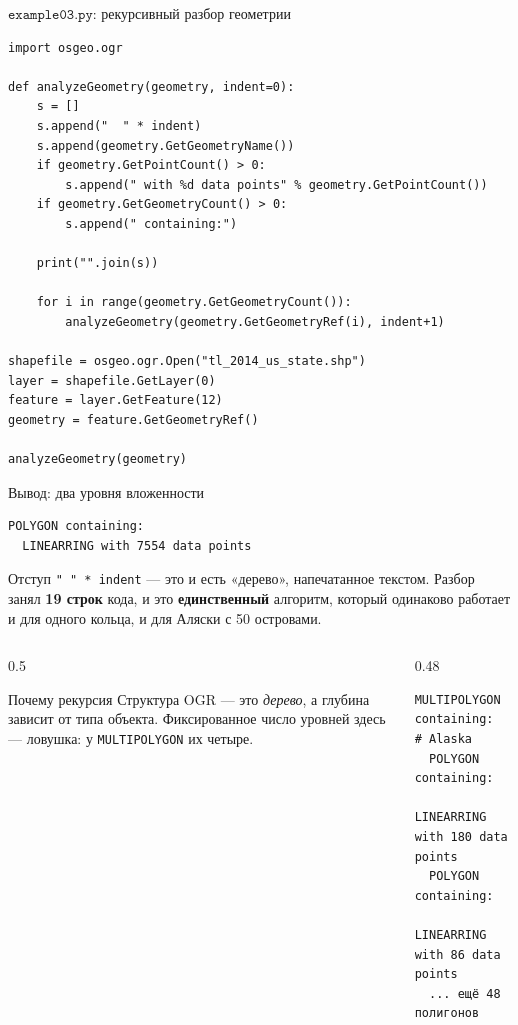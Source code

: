 \documentclass[aspectratio=169,10pt]{beamer}
\begin{document}
\begin{frame}[fragile]{$\texttt{example03.py}$: рекурсивный разбор геометрии}
\begin{Verbatim}
import osgeo.ogr

def analyzeGeometry(geometry, indent=0):
    s = []
    s.append("  " * indent)
    s.append(geometry.GetGeometryName())
    if geometry.GetPointCount() > 0:
        s.append(" with %d data points" % geometry.GetPointCount())
    if geometry.GetGeometryCount() > 0:
        s.append(" containing:")

    print("".join(s))

    for i in range(geometry.GetGeometryCount()):
        analyzeGeometry(geometry.GetGeometryRef(i), indent+1)

shapefile = osgeo.ogr.Open("tl_2014_us_state.shp")
layer = shapefile.GetLayer(0)
feature = layer.GetFeature(12)
geometry = feature.GetGeometryRef()

analyzeGeometry(geometry)
\end{Verbatim}
\end{frame}

\begin{frame}[fragile]{Вывод: два уровня вложенности}
\begin{Verbatim}[numbers=none]
POLYGON containing:
  LINEARRING with 7554 data points
\end{Verbatim}

\vspace{0.3em}
{\small Отступ \texttt{"  " * indent} --- это и есть «дерево»,
напечатанное текстом. Разбор занял \textbf{19 строк} кода, и это
\textbf{единственный} алгоритм, который одинаково работает и для одного
кольца, и для Аляски с 50 островами.}

\vspace{0.5em}
\begin{columns}[T,onlytextwidth]
  \begin{column}{0.5\textwidth}
    \begin{block}{Почему рекурсия}\small
      Структура OGR --- это \emph{дерево}, а глубина зависит от типа
      объекта. Фиксированное число уровней здесь --- ловушка:
      у \texttt{MULTIPOLYGON} их четыре.
    \end{block}
  \end{column}
  \begin{column}{0.48\textwidth}
    \begin{Verbatim}[fontsize=\tiny]
MULTIPOLYGON containing:   # Alaska
  POLYGON containing:
    LINEARRING with 180 data points
  POLYGON containing:
    LINEARRING with 86 data points
  ... ещё 48 полигонов
\end{Verbatim}
  \end{column}
\end{columns}
\end{frame}
\end{document}
